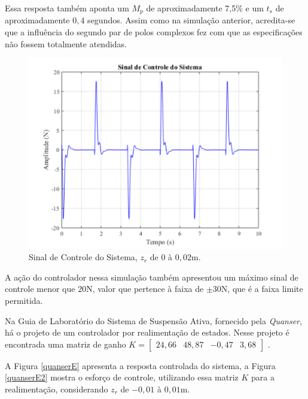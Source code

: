 \documentclass[journal,brazil,english]{IEEEtran}
\begin{document}
Essa resposta também aponta um $M_p$ de aproximadamente 7,5\% e um $t_s$ de aproximadamente $0,4$ segundos. Assim como na simulação anterior, acredita-se que a influência do segundo par de polos complexos fez com que as especificações não fossem totalmente atendidas.

\begin{figure}[H]
	\centering
\includegraphics[width=\columnwidth]{./imagens/sinal_controle_sistema2.pdf}
    \renewcommand{\figurename}{Fig.}
    \caption{Sinal de Controle do Sistema, $z_r$ de $0$ à $0,02$m.}
	\label{sinalcontroleEE2}
\end{figure}
A ação do controlador nessa simulação também apresentou um máximo sinal de controle menor que $20$N, valor que pertence à faixa de $\pm 30$N, que é a faixa limite permitida.

Na Guia de Laboratório do Sistema de Suspensão Ativa, fornecido pela \textit{Quanser}, há o projeto de um controlador por realimentação de estados. Nesse projeto é encontrada uma matriz de ganho $K =
\left[\begin{matrix}
24,66 & 48,87 & -0,47 & 3,68
\end{matrix}\right]$ \cite{quanser}.

A Figura \ref{quanserE} apresenta a resposta controlada do sistema, a Figura \ref{quanserE2} mostra o esforço de controle, utilizando essa matriz $K$ para a realimentação, considerando $z_r$ de $-0,01$ à $0,01$m.
\end{document}
